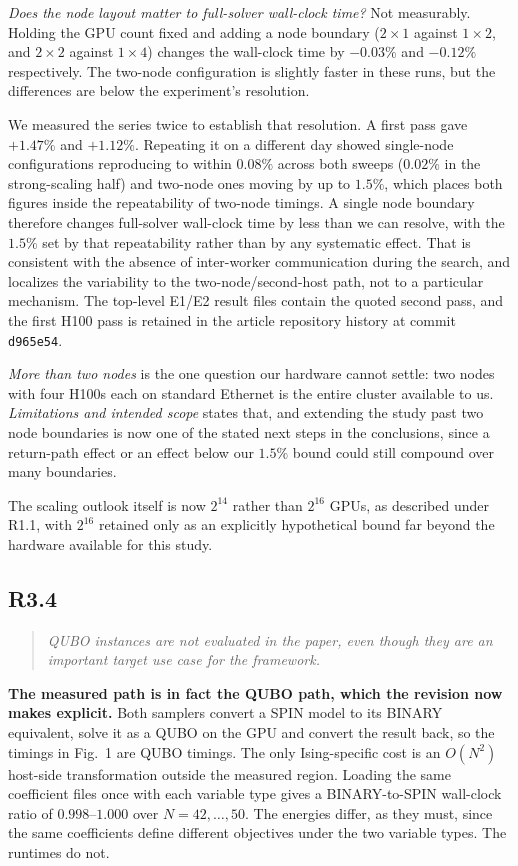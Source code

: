 \documentclass[11pt,a4paper]{article}
\newenvironment{reviewercomment}
  {\begin{quote}\itshape\small}
  {\end{quote}}
\newcommand{\point}[2]{%
  \subsection*{#1}%
  \begin{reviewercomment}#2\end{reviewercomment}}
\begin{document}
\emph{Does the node layout matter to full-solver wall-clock time?} Not measurably. Holding the
GPU count fixed and adding a node boundary ($2\times1$ against $1\times2$, and
$2\times2$ against $1\times4$) changes
the wall-clock time by $-0.03\%$ and $-0.12\%$ respectively. The two-node configuration is
slightly faster in these runs, but the differences are below the experiment's resolution.

We measured the series twice to establish that resolution. A first pass gave $+1.47\%$ and
$+1.12\%$. Repeating it on a different day showed single-node configurations reproducing to
within $0.08\%$ across both sweeps ($0.02\%$ in the strong-scaling half) and two-node ones
moving by up to $1.5\%$, which places both figures inside the repeatability of two-node
timings. A single node boundary therefore changes full-solver wall-clock time by less than we
can resolve, with the $1.5\%$ set by that repeatability rather than by any systematic effect.
That is consistent with the absence of inter-worker communication during the search, and
localizes the variability to the two-node/second-host path, not to a particular
mechanism. The top-level E1/E2 result files contain the quoted second pass, and the first H100
pass is retained in the article repository history at commit \texttt{d965e54}.

\emph{More than two nodes} is the one question our hardware cannot settle: two nodes with four
H100s each on standard Ethernet is the entire cluster available to us. \emph{Limitations and
intended scope} states that, and extending the study past two node boundaries is now one of
the stated next steps in the conclusions, since a return-path effect or an effect below our
$1.5\%$ bound could still compound over many boundaries.

The scaling outlook itself is now $2^{14}$ rather than $2^{16}$ GPUs, as described under R1.1,
with $2^{16}$ retained only as an explicitly hypothetical bound far beyond the hardware
available for this study.

\point{R3.4}{QUBO instances are not evaluated in the paper, even though they are an important
target use case for the framework.}

\textbf{The measured path is in fact the QUBO path, which the revision now makes explicit.}
Both samplers convert a SPIN model to its BINARY equivalent, solve it as a QUBO on the GPU and
convert the result back, so the timings in Fig.~1 are QUBO timings. The only Ising-specific
cost is an $O(N^{2})$ host-side transformation outside the measured region. Loading the same
coefficient files once with each variable type gives a BINARY-to-SPIN wall-clock ratio of
$0.998$--$1.000$ over $N=42,\dots,50$. The energies differ, as they must, since the same
coefficients define different objectives under the two variable types. The runtimes do not.
\end{document}
